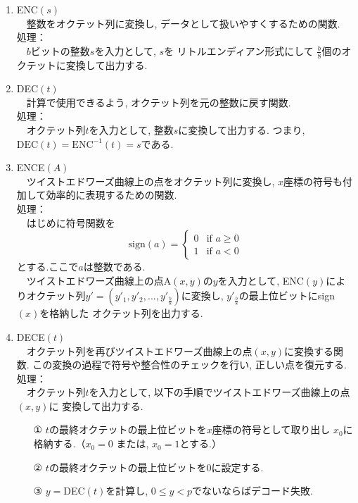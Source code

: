 \begin{enumerate}
  \item ENC$(s)$\\
  　整数をオクテット列に変換し, データとして扱いやすくするための関数.\\
  処理：\\
  　$b$ビットの整数$s$を入力として, $s$を リトルエンディアン形式にして
  $\tfrac{b}{8}$個のオクテットに変換して出力する.
  \item DEC$(t)$\\
  　計算で使用できるよう, オクテット列を元の整数に戻す関数.\\
  処理：\\
  　オクテット列$t$を入力として, 整数$s$に変換して出力する.
  つまり, $\mathrm{DEC}(t)=\mathrm{ENC}^{-1}(t)=s$である.
  \item ENCE$(A)$\\
  　ツイストエドワーズ曲線上の点をオクテット列に変換し, 
  $x$座標の符号も付加して効率的に表現するための関数.\\
  処理：\\
  　はじめに符号関数を
  \[
    \text{sign}(a) =
    \begin{cases}
    0 & \text{if } a \geq 0 \\
    1 & \text{if } a < 0
    \end{cases}
  \]
  とする.ここで$a$は整数である.\\
  　ツイストエドワーズ曲線上の点A$(x,y)$の$y$を入力として, 
  ENC$(y)$によりオクテット列$y'=(y'_1,y'_2,...,y'_\frac{b}{8})$に変換し, 
  $y'_\frac{b}{8}$の最上位ビットにsign$(x)$を格納した
  オクテット列を出力する.
  \item DECE$(t)$\\
  　オクテット列を再びツイストエドワーズ曲線上の点$(x, y)$に変換する関数.
  この変換の過程で符号や整合性のチェックを行い, 正しい点を復元する.\\
  処理：\\
  　オクテット列$t$を入力として, 以下の手順でツイストエドワーズ曲線上の点$(x,y)$に
  変換して出力する.
  \begin{enumerate}
    \item[①　] $t$の最終オクテットの最上位ビットを$x$座標の符号として取り出し
    $x_0$に格納する.（$x_0=0$ または, $x_0=1$とする.）
    \item[②　] $t$の最終オクテットの最上位ビットを0に設定する.
    \item[③　] $y=$DEC$(t)$を計算し, $0\leq y<p$でないならばデコード失敗.

\end{enumerate}
\end{enumerate}
